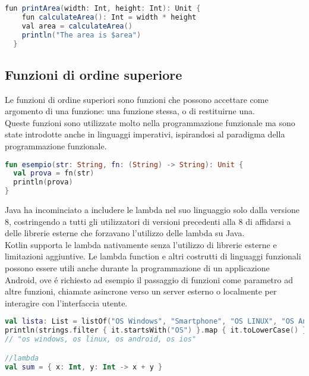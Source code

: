 \begin{lstlisting}[language=java,caption={Esempio Funzioni locali}]
  fun printArea(width: Int, height: Int): Unit {
    fun calculateArea(): Int = width * height
    val area = calculateArea()
    println("The area is $area")
  }
\end{lstlisting}

\subsection{Funzioni di ordine superiore }
Le funzioni di ordine superiori sono funzioni che possono accettare come argomento di una funzione: una funzione stessa, o di restituirne una.\\
Queste funzioni sono utilizzate molto nella programmazione funzionale ma sono state introdotte anche in linguaggi imperativi, ispirandosi al paradigma della programmazione funzionale. \\

\begin{lstlisting}[language=kotlin,caption={Funzioni ordine superiore}]
fun esempio(str: String, fn: (String) -> String): Unit {
  val prova = fn(str)
  println(prova)
}
\end{lstlisting}

Java ha incominciato a includere le lambda nel suo linguaggio solo dalla versione 8, costringendo a tutti gli utilizzatori di versioni precedenti alla 8 di affidarsi a delle librerie esterne che forzavano l'utilizzo delle lambda su Java. \\
Kotlin  supporta le lambda nativamente senza l'utilizzo di librerie esterne e limitazioni aggiuntive.
Le lambda function e altri costrutti di linguaggi funzionali possono essere utili anche durante la programmazione di un applicazione Android, ove \'e richiesto ad esempio il passaggio di funzioni come parametro ad altre funzioni, chiamate asincrone verso un server esterno o localmente per interagire con l'interfaccia utente.

\begin{lstlisting}[language=kotlin,caption={Esempio Kotlin Programmazione funzionale}]
val lista: List = listOf("OS Windows", "Smartphone", "OS LINUX", "OS Android", "RAM", "OS IOS", "Scarpe")
println(strings.filter { it.startsWith("OS") }.map { it.toLowerCase() }.joinToString())
// "os windows, os linux, os android, os ios"

//lambda
val sum = { x: Int, y: Int -> x + y }
\end{lstlisting}




